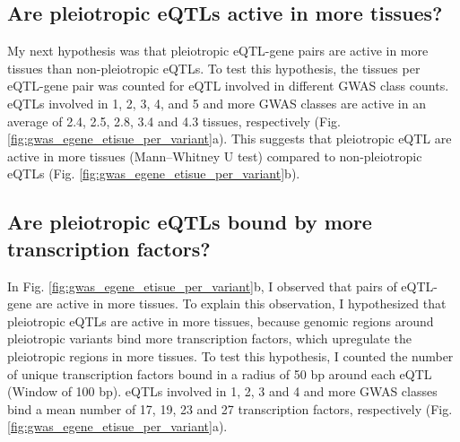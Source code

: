 \subsection*{Are pleiotropic eQTLs active in more tissues?}

My next hypothesis was that pleiotropic eQTL-gene pairs are active in more tissues than non-pleiotropic eQTLs.
%
To test this hypothesis, the tissues per eQTL-gene pair was counted for eQTL involved in different GWAS class counts.
%
eQTLs involved in 1, 2, 3, 4, and 5 and more GWAS classes are active in an average of 2.4, 2.5, 2.8, 3.4 and 4.3 tissues, respectively (Fig. \ref{fig:gwas_egene_etisue_per_variant}a).
%
This suggests that pleiotropic eQTL are active in more tissues (Mann–Whitney U test) compared to non-pleiotropic eQTLs (Fig. \ref{fig:gwas_egene_etisue_per_variant}b).

%
%

\subsection*{Are pleiotropic eQTLs bound by more transcription factors?}

In Fig. \ref{fig:gwas_egene_etisue_per_variant}b, I observed that pairs of eQTL-gene are active in more tissues.
%
To explain this observation, I hypothesized that pleiotropic eQTLs are active in more tissues,
because genomic regions around pleiotropic variants bind more transcription factors,
which upregulate the pleiotropic regions in more tissues.
%
To test this hypothesis, I counted the number of unique transcription factors bound in a radius of 50 bp around each eQTL (Window of 100 bp).
%
eQTLs involved in 1, 2, 3 and 4 and more GWAS classes bind a mean number of 17,
19, 23 and 27 transcription factors, respectively (Fig. \ref{fig:gwas_egene_etisue_per_variant}a).

